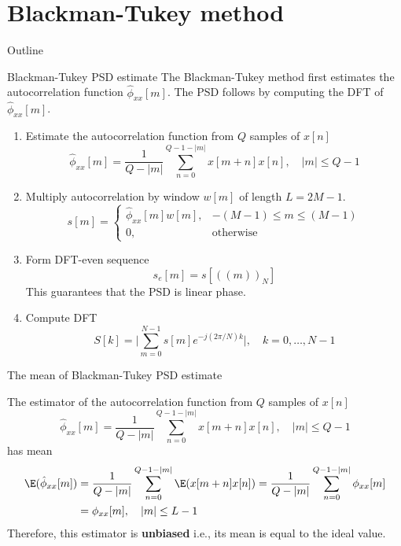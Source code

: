 \documentclass[10pt, aspectratio=169, handout]{beamer}
\begin{document}
\section{Blackman-Tukey method}
\begin{frame}{Outline}
\tableofcontents[currentsection]
\end{frame}

%
\begin{frame}{Blackman-Tukey PSD estimate}
	The Blackman-Tukey method first estimates the autocorrelation function $\hat{\phi}_{xx}[m]$. The PSD follows by computing the DFT of $\hat{\phi}_{xx}[m]$.
	\begin{enumerate}
		\item Estimate the autocorrelation function from $Q$ samples of $x[n]$
		\begin{equation*}
			\hat{\phi}_{xx}[m] = \frac{1}{Q-|m|}\sum_{n = 0}^{Q-1-|m|} x[m+n]x[n], \quad |m|\leq Q-1
		\end{equation*}
		\item Multiply autocorrelation by window $w[m]$ of length $L = 2M-1$.
		\begin{equation*}
			s[m] = \begin{cases}
			\hat{\phi}_{xx}[m]w[m], & -(M-1)\leq m \leq (M-1) \\
			0, & \text{otherwise}
			\end{cases}
		\end{equation*}
		\item Form DFT-even sequence
		\begin{equation*}
			s_e[m] = s[((m))_N]
		\end{equation*}	
		This guarantees that the PSD is linear phase.
		\item Compute DFT
		\begin{equation*}
			S[k] = \bigg|\sum_{m = 0}^{N-1}s[m]e^{-j(2\pi/N)k}\bigg|, \quad k = 0, \ldots, N-1
		\end{equation*}
	\end{enumerate}
\end{frame}

%
\begin{frame}{The mean of Blackman-Tukey PSD estimate}

The estimator of the autocorrelation function from $Q$ samples of $x[n]$
\begin{equation*}
\hat{\phi}_{xx}[m] = \frac{1}{Q-|m|}\sum_{n = 0}^{Q-1-|m|} x[m+n]x[n], \quad |m|\leq Q-1
\end{equation*}
has mean
\begin{align*}
\E(\hat{\phi}_{xx}[m]) &= \frac{1}{Q-|m|}\sum_{n=0}^{Q-1-|m|} \E(x[m+n]x[n]) = \frac{1}{Q-|m|}\sum_{n=0}^{Q-1-|m|}\phi_{xx}[m] \\
&=\phi_{xx}[m], \quad |m|\leq L-1
\end{align*}
Therefore, this estimator is \textbf{unbiased} i.e., its mean is equal to the ideal value.
\end{frame}
\end{document}

